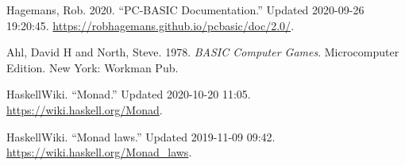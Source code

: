 \begin{itemlist}
\item Hagemans, Rob. 2020. ``PC-BASIC Documentation.'' Updated 2020-09-26 19:20:45. \url{https://robhagemans.github.io/pcbasic/doc/2.0/}.
\item Ahl, David H and North, Steve. 1978. \emph{BASIC Computer Games}. Microcomputer Edition. New York: Workman Pub.
\item HaskellWiki. ``Monad.'' Updated 2020-10-20 11:05. \url{https://wiki.haskell.org/Monad}.
\item HaskellWiki. ``Monad laws.'' Updated 2019-11-09 09:42. \url{https://wiki.haskell.org/Monad_laws}.
\end{itemlist}
